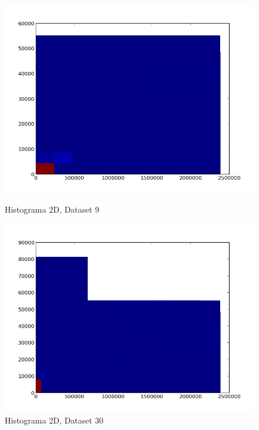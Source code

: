 \documentclass[pdftex,12pt,a4paper]{report}
\begin{document}
\begin{figure}[!htb]
  \centering
  \begin{minipage}[b]{0.4\textwidth}
    \includegraphics[width=\textwidth]{multivariate_dist/histogram2d_serv_9.png}
    \caption{Histograma 2D, Dataset 9}
    \label{fig:hist_serv9}
  \end{minipage}
  \hfill
  \begin{minipage}[b]{0.4\textwidth}
    \includegraphics[width=\textwidth]{multivariate_dist/histogram2d_serv_30.png}
    \caption{Histograma 2D, Dataset 30}
    \label{fig:hist_serv30}
  \end{minipage}
\end{figure}
\end{document}

